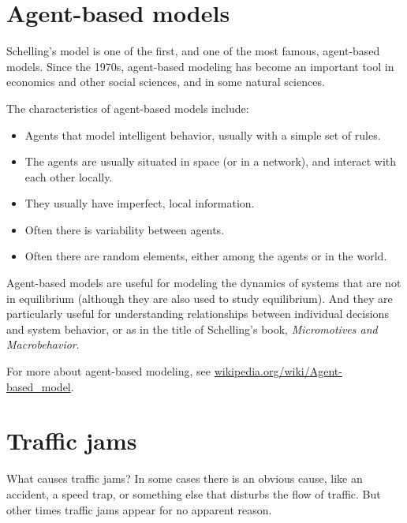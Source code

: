 \documentclass[10pt]{book}
\begin{document}
\section{Agent-based models}

Schelling's model is one of the first, and one of the most
famous, agent-based models.  Since the 1970s, agent-based
modeling has become an important tool in economics and other
social sciences, and in some natural sciences.

The characteristics of agent-based models include:

\begin{itemize}

\item Agents that model intelligent behavior, usually with a simple
  set of rules.

\item The agents are usually situated in space (or in a network), and
  interact with each other locally.

\item They usually have imperfect, local information.

\item Often there is variability between agents.

\item Often there are random elements, either among the agents or in
  the world.

\end{itemize}

Agent-based models are useful for modeling the dynamics of systems
that are not in equilibrium (although they are also used to study
equilibrium).  And they are particularly useful for understanding
relationships between individual decisions and system behavior, or as
in the title of Schelling's book, {\em Micromotives and Macrobehavior}.

For more about agent-based modeling, see
\url{wikipedia.org/wiki/Agent-based_model}.


\section{Traffic jams}

What causes traffic jams?  In some cases there is an obvious cause,
like an accident, a speed trap, or something else that disturbs
the flow of traffic.  But other times traffic jams appear for no
apparent reason.
\end{document}
